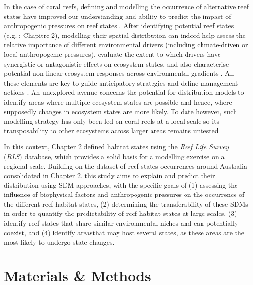 \begin{refsection}
In the case of coral reefs, defining and modelling the occurrence of
alternative reef states have improved our understanding and ability to
predict the impact of anthropogenic pressures on reef states \autocites[
]{Jouffray_2015}[ ]{Jouffray_2019}{Donovan_2018}. After identifying
potential reef states (e.g. \textcite{Donovan_2018} ; Chapitre 2),
modelling their spatial distribution can indeed help assess the relative
importance of different environmental drivers (including climate-driven
or local anthropogenic pressures), evaluate the extent to which drivers
have synergistic or antagonistic effects on ecosystem states, and also
characterise potential non-linear ecosystem responses across
environmental gradients \autocites[ ]{Jouffray_2015}{Jouffray_2019}. All
these elements are key to guide anticipatory strategies and define
management actions \autocites[ ]{Litzow_2016b}{Turner_2020}. An
unexplored avenue concerns the potential for distribution models to
identify areas where multiple ecosystem states are possible and hence,
where supposedly changes in ecosystem states are more likely. To date
however, such modelling strategy has only been led on coral reefs at a
local scale \autocite{Jouffray_2019} so its transposability to other
ecosystems across larger areas remains untested.

In this context, Chapter 2 defined habitat states using the \emph{Reef
Life Survey} (\emph{RLS}) database, which provides a solid basis for a
modelling exercise on a regional scale. Building on the dataset of reef
states occurrences around Australia consolidated in Chapter 2, this
study aims to explain and predict their distribution using SDM
approaches, with the specific goals of (1) assessing the influence of
biophysical factors and anthropogenic pressures on the occurrence of the
different reef habitat states, (2) determining the transferability of
these SDMs in order to quantify the predictability of reef habitat
states at large scales, (3) identify reef states that share similar
environmental niches and can potentially coexist, and (4) identify
areasthat may host several states, as these areas are the most likely to
undergo state changes.

\clearpage

\hypertarget{mat-met-chapt3}{%
\section{Materials \& Methods}\label{mat-met-chapt3}}

\hypertarget{datasets}{%
}
\end{refsection}
